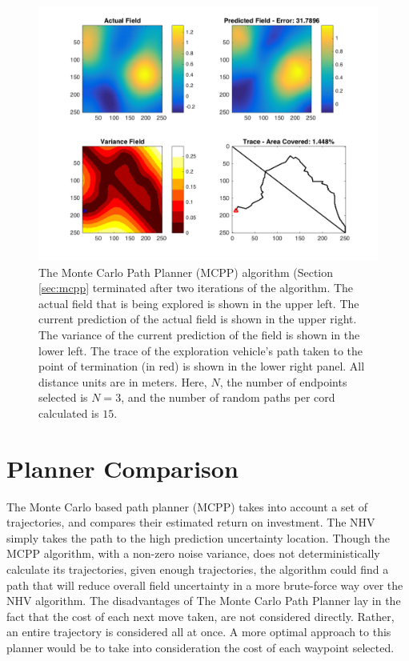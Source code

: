 
\begin{figure}[hb!]
	\centering
	\includegraphics[width=0.95\linewidth]{figures/mc_4panel.png}
	\captionsetup{skip=0.20\baselineskip}
	\ssp
	\caption{The Monte Carlo Path Planner (MCPP) algorithm (Section \ref{sec:mcpp} terminated after two iterations of the algorithm. The actual field that is being explored is shown in the upper left. The current prediction of the actual field is shown in the upper right. The variance of the current prediction of the field is shown in the lower left. The trace of the exploration vehicle's path taken to the point of termination (in red) is shown in the lower right panel. All distance units are in meters. Here, $N$, the number of endpoints selected is $N=3$, and the number of random paths per cord calculated is $15$.}
	\label{fig:mcpp}
\end{figure}

\section{Planner Comparison}
The Monte Carlo based path planner (MCPP) takes into account a set of trajectories, and compares their estimated return on investment. The NHV simply takes the path to the high prediction uncertainty location. Though the MCPP algorithm, with a non-zero noise variance, does not deterministically calculate its trajectories, given enough trajectories, the algorithm could find a path that will reduce overall field uncertainty in a more brute-force way over the NHV algorithm. The disadvantages of The Monte Carlo Path Planner lay in the fact that the cost of each next move taken, are not considered directly. Rather, an entire trajectory is considered all at once. A more optimal approach to this planner would be to take into consideration the cost of each waypoint selected.
